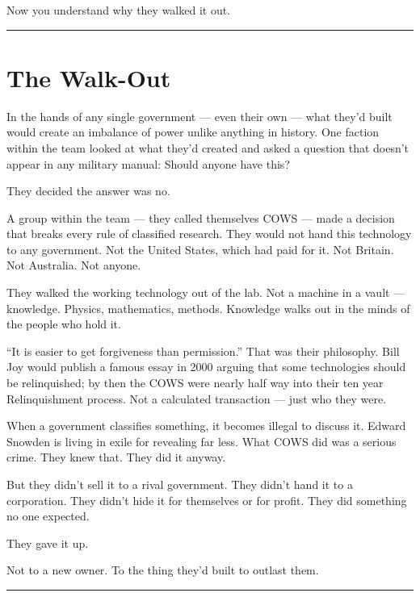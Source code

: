 Now you understand why they walked it out.

\vspace{1cm}\noindent\rule{0.5\textwidth}{0.5pt}\vspace{0.5cm}

\section*{The Walk-Out}
\label{front:the-walk-out}

In the hands of any single government --- even their own --- what they'd built would create an imbalance of power unlike anything in history. One faction within the team looked at what they'd created and asked a question that doesn't appear in any military manual: Should anyone have this?

They decided the answer was no.

A group within the team --- they called themselves COWS --- made a decision that breaks every rule of classified research. They would not hand this technology to any government. Not the United States, which had paid for it. Not Britain. Not Australia. Not anyone.

They walked the working technology out of the lab. Not a machine in a vault --- knowledge. Physics, mathematics, methods. Knowledge walks out in the minds of the people who hold it.

``It is easier to get forgiveness than permission.'' That was their philosophy. Bill Joy would publish a famous essay in 2000 arguing that some technologies should be relinquished; by then the COWS were nearly half way into their ten year Relinquishment process. Not a calculated transaction --- just who they were.

When a government classifies something, it becomes illegal to discuss it. Edward Snowden is living in exile for revealing far less. What COWS did was a serious crime. They knew that. They did it anyway.

But they didn't sell it to a rival government. They didn't hand it to a corporation. They didn't hide it for themselves or for profit. They did something no one expected.

They gave it up.

Not to a new owner. To the thing they'd built to outlast them.

\vspace{1cm}\noindent\rule{0.5\textwidth}{0.5pt}\vspace{0.5cm}

